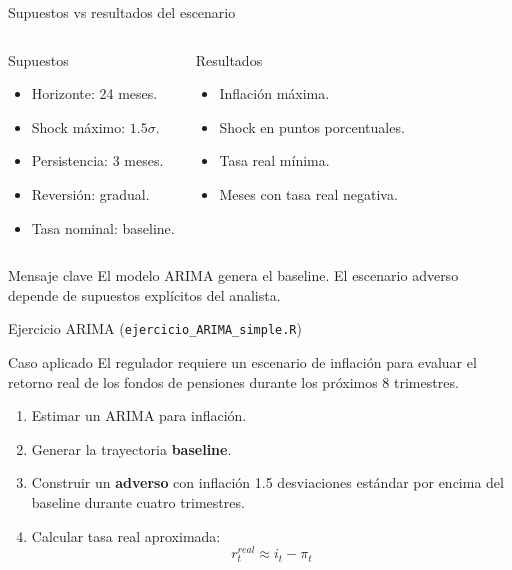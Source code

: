\documentclass[10pt,aspectratio=169]{beamer}
\newcommand{\baseline}{\textcolor{MacropolTeal}{\textbf{baseline}}}
\newcommand{\adverso}{\textcolor{red!70!black}{\textbf{adverso}}}
\begin{document}
\begin{frame}{Supuestos vs resultados del escenario}
\begin{columns}

\begin{block}{Supuestos}
\begin{itemize}
\item Horizonte: 24 meses.
\item Shock máximo: $1.5\sigma$.
\item Persistencia: 3 meses.
\item Reversión: gradual.
\item Tasa nominal: baseline.
\end{itemize}
\end{block}

\begin{block}{Resultados}
\begin{itemize}
\item Inflación máxima.
\item Shock en puntos porcentuales.
\item Tasa real mínima.
\item Meses con tasa real negativa.
\end{itemize}
\end{block}

\end{columns}

\vspace{0.4cm}

\begin{alertblock}{Mensaje clave}
El modelo ARIMA genera el baseline. El escenario adverso depende de supuestos explícitos del analista.
\end{alertblock}
\end{frame}

\begin{frame}{Ejercicio ARIMA (\texttt{ejercicio\_ARIMA\_simple.R})}
\begin{block}{Caso aplicado}
El regulador requiere un escenario de inflación para evaluar el retorno real de los fondos de pensiones durante los próximos 8 trimestres.
\end{block}

\begin{enumerate}
  \item Estimar un ARIMA para inflación.
  \item Generar la trayectoria \baseline{}.
  \item Construir un \adverso{} con inflación 1.5 desviaciones estándar por encima del baseline durante cuatro trimestres.
  \item Calcular tasa real aproximada:
  \[
  r^{real}_t \approx i_t - \pi_t
  \]
\end{enumerate}
\end{frame}
\end{document}
